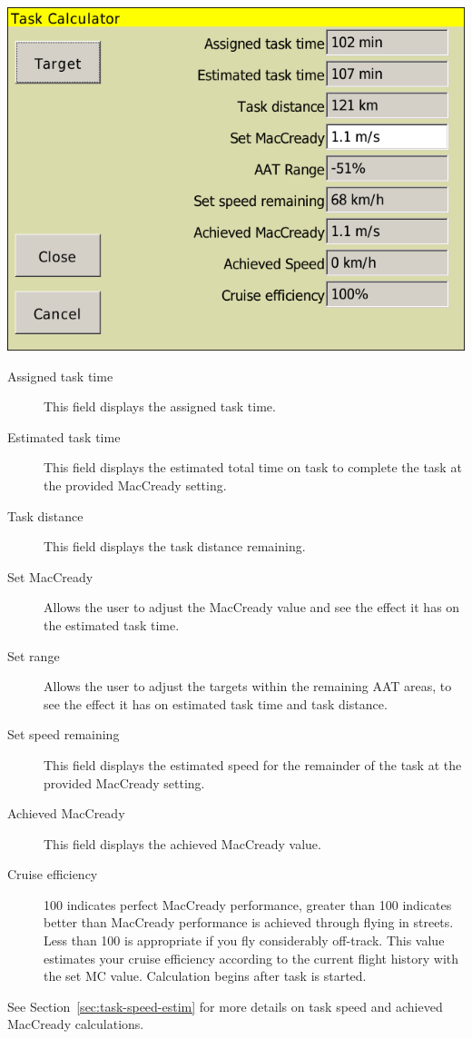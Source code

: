 \documentclass[a4paper,12pt]{refrep}
\begin{document}
\begin{center}
\includegraphics[angle=0,width=0.8\linewidth,keepaspectratio='true']{figures/dialog-taskcalc3.png}
\end{center}

\begin{description}
\item[Assigned task time]  This field displays the assigned task time.
\item[Estimated task time]  This field displays the estimated total time 
 on task to complete the task at the provided MacCready setting.
\item[Task distance]  This field displays the task distance remaining.
\item[Set MacCready]  Allows the user to adjust the MacCready value and 
 see the effect it has on the estimated task time.
\item[Set range]  Allows the user to adjust the targets within the remaining 
 AAT areas, to see the effect it has on estimated task time and task distance.
\item[Set speed remaining]  This field displays the estimated speed for the
 remainder of the task at the provided MacCready setting.
\item[Achieved MacCready]  This field displays the achieved MacCready value.
\item[Cruise efficiency]  100 indicates perfect MacCready performance, greater 
than 100 indicates better than MacCready performance is achieved through flying
in streets. Less than 100 is appropriate if you fly considerably off-track. This 
value estimates your cruise efficiency according to the current flight history 
with the set MC value. Calculation begins after task is started.
\end{description}
See Section~\ref{sec:task-speed-estim} for more details on task speed
and achieved MacCready calculations.
\end{document}
